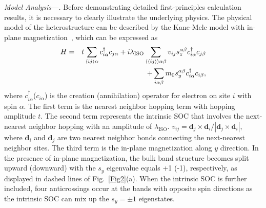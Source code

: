 \documentclass[aps,prl,twocolumn,showpacs,superscriptaddress]{revtex4-1}
\begin{document}
\textit{Model Analysis---.}
Before demonstrating detailed first-principles calculation results, it is necessary to clearly illustrate the underlying physics. The physical model of the heterostructure can be described by the Kane-Mele model with in-plane magnetization~\cite{DFT_PHS1,DFT_PHS2,DFT_PHS3,2021_zheng,Kane-Mele model}, which can be expressed as
\begin{eqnarray}\label{eq:Ham}
H & = & t\sum_{\langle ij \rangle \alpha}c_{i\alpha}^{\dagger}c_{j\alpha}+i\lambda_{\rm ISO}\sum_{\langle\langle ij \rangle\rangle\alpha\beta}v_{ij}s^{\alpha\beta}_{z}c_{i\alpha}^{\dagger}c_{j\beta} \notag\\
&& +\sum_{i\alpha\beta}m_0s^{\alpha\beta}_yc_{i\alpha}^{\dagger}c_{i\beta},
\end{eqnarray}
where $c^{\dagger}_{i\alpha}$($c_{i\alpha}$) is the creation (annihilation) operator for electron on site $i$ with spin $\alpha$. The first term is the nearest neighbor hopping term with hopping amplitude $t$. The second term represents the intrinsic SOC that involves the next-nearest neighbor hopping with an amplitude of $\lambda_{\text{ISO}}$. $v_{ij}=\boldsymbol{d}_j\times\boldsymbol{d}_i/|\boldsymbol{d}_j\times\boldsymbol{d}_i|$, where $\boldsymbol{d}_i$ and $\boldsymbol{d}_j$ are two nearest neighbor bonds connecting the next-nearest neighbor sites. The third term is the in-plane magnetization along $y$ direction.
In the presence of in-plane magnetization, the bulk band structure becomes split upward (downward) with the $s_y$ eigenvalue equals +1 (-1), respectively, as displayed in dashed lines of Fig.~\ref{Fig2}(a). When the intrinsic SOC is further included, four anticrossings occur at the bands with opposite spin directions as the intrinsic SOC can mix up the $s_y=\pm1$ eigenstates.
\end{document}
